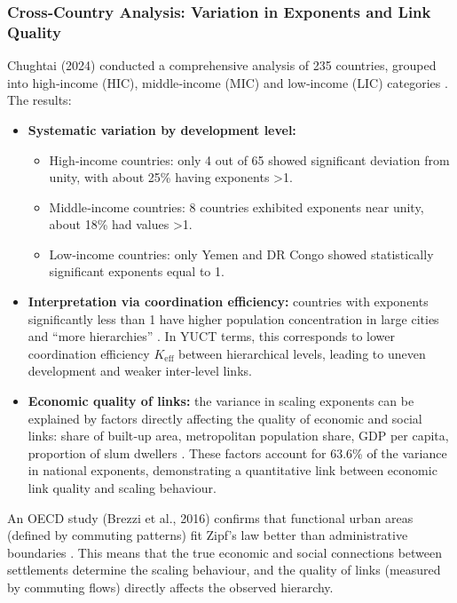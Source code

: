 \documentclass[11pt]{article}
\theoremstyle{remark}
\newcommand{\Keff}{K_{\mathrm{eff}}}
\begin{document}
	\subsubsection{Cross‑Country Analysis: Variation in Exponents and Link Quality}
	Chughtai (2024) conducted a comprehensive analysis of 235 countries, grouped into high‑income (HIC), middle‑income (MIC) and low‑income (LIC) categories \cite{Chughtai2024}. The results:
	\begin{itemize}
		\item \textbf{Systematic variation by development level:}
		\begin{itemize}
			\item High‑income countries: only 4 out of 65 showed significant deviation from unity, with about 25\% having exponents >1.
			\item Middle‑income countries: 8 countries exhibited exponents near unity, about 18\% had values >1.
			\item Low‑income countries: only Yemen and DR Congo showed statistically significant exponents equal to 1.
		\end{itemize}
		\item \textbf{Interpretation via coordination efficiency:} countries with exponents significantly less than 1 have higher population concentration in large cities and ``more hierarchies'' \cite{Chughtai2024}. In YUCT terms, this corresponds to lower coordination efficiency \(\Keff\) between hierarchical levels, leading to uneven development and weaker inter‑level links.
		\item \textbf{Economic quality of links:} the variance in scaling exponents can be explained by factors directly affecting the quality of economic and social links: share of built‑up area, metropolitan population share, GDP per capita, proportion of slum dwellers \cite{Xu2023}. These factors account for 63.6\% of the variance in national exponents, demonstrating a quantitative link between economic link quality and scaling behaviour.
	\end{itemize}
	
	An OECD study (Brezzi et al., 2016) confirms that functional urban areas (defined by commuting patterns) fit Zipf's law better than administrative boundaries \cite{Brezzi2016}. This means that the true economic and social connections between settlements determine the scaling behaviour, and the quality of links (measured by commuting flows) directly affects the observed hierarchy.
	
\end{document}
